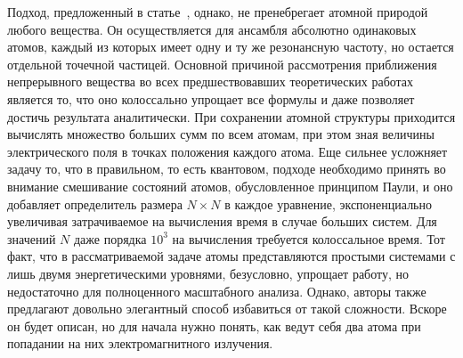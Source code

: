 \documentclass[a4paper, 14pt]{extarticle}
\begin{document}
Подход, предложенный в статье~\cite{one}, однако, не пренебрегает 
атомной природой любого вещества. Он осуществляется для ансамбля 
абсолютно одинаковых атомов, каждый из которых имеет одну и ту же 
резонансную частоту, но остается отдельной точечной частицей. Основной 
причиной рассмотрения приближения непрерывного вещества во всех 
предшествовавших теоретических работах является то, что оно колоссально 
упрощает все формулы и даже позволяет достичь результата аналитически. 
При сохранении атомной структуры приходится вычислять множество больших 
сумм по всем атомам, при этом зная величины электрического поля в точках 
положения каждого атома. Еще сильнее усложняет задачу то, что 
в правильном, то есть квантовом, подходе необходимо принять во внимание 
смешивание состояний атомов, обусловленное принципом Паули, и оно 
добавляет определитель размера $N\times N$ в каждое уравнение, 
экспоненциально увеличивая затрачиваемое на вычисления время в случае 
больших систем. Для значений $N$ даже порядка $10^3$ на вычисления 
требуется колоссальное время. Тот факт, что в рассматриваемой задаче 
атомы представляются простыми системами с лишь двумя энергетическими 
уровнями, безусловно, упрощает работу, но недостаточно для полноценного 
масштабного анализа. Однако, авторы также предлагают довольно элегантный 
способ избавиться от такой сложности. Вскоре он будет описан, но для 
начала нужно понять, как ведут себя два атома при попадании на них 
электромагнитного излучения.


\end{document}
